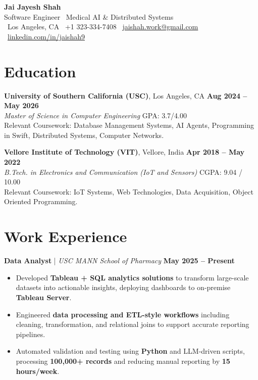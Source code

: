 \documentclass[letterpaper,11pt]{article}
\begin{document}
\begin{center}
    {\LARGE \textbf{Jai Jayesh Shah}}\\
    {\normalsize Software Engineer \textbar\ Medical AI \& Distributed Systems}\\
    \small
    \faMapMarker*\ Los Angeles, CA
    \quad
    \faPhone*\ +1 323-334-7408
    \quad
    \faEnvelope\ \href{mailto:jaishah.work@gmail.com} {jaishah.work@gmail.com}
    \quad
    \faLinkedin\ \href{https://www.linkedin.com/in/jaishah9} {linkedin.com/in/jaishah9}
\end{center}
\vspace{-13pt}

\section*{Education}
\textbf{University of Southern California (USC)}, Los Angeles, CA \hfill \textbf{Aug 2024 -- May 2026} \\
\textit{Master of Science in Computer Engineering} \hfill GPA: 3.7/4.00 \\
Relevant Coursework: Database Management Systems, AI Agents, Programming in Swift, Distributed Systems, Computer Networks.

\vspace{1pt}

\textbf{Vellore Institute of Technology (VIT)}, Vellore, India \hfill \textbf{Apr 2018 -- May 2022} \\
\textit{B.Tech. in Electronics and Communication (IoT and Sensors)} \hfill CGPA: 9.04 / 10.00 \\
Relevant Coursework: IoT Systems, Web Technologies, Data Acquisition, Object Oriented Programming.

\section*{Work Experience}
\textbf{Data Analyst} \;|\; \textit{USC MANN School of Pharmacy} \hfill \textbf{May 2025 -- Present} \\
\begin{itemize}[noitemsep]
    \item Developed \textbf{Tableau + SQL analytics solutions} to transform large-scale datasets into actionable insights, deploying dashboards to on-premise \textbf{Tableau Server}.
    \item Engineered \textbf{data processing and ETL-style workflows} including cleaning, transformation, and relational joins to support accurate reporting pipelines.
    \item Automated validation and testing using \textbf{Python} and LLM-driven scripts, processing \textbf{100,000+ records} and reducing manual reporting by \textbf{15 hours/week}.
\end{itemize}
\end{document}
